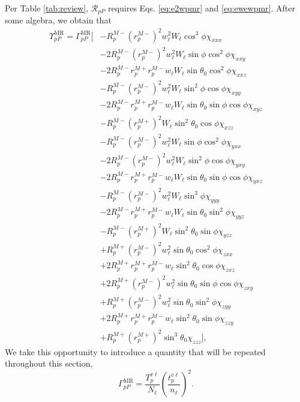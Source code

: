 Per Table \ref{tab:review}, $\mathcal{R}_{pP}$ requires Eqs. \eqref{eq:e2wpmr}
and \eqref{eq:ewewpmr}. After some algebra, we obtain that
\begin{equation}\label{eq:rppfullmr}
\begin{split}
\Upsilon^{\mathrm{MR}}_{pP} =
\Gamma^{\mathrm{MR}}_{pP}
\bigg[
&-R^{M-}_{p}\left(r^{M-}_{p}\right)^{2}w^{2}_{\ell}W_{\ell}\cos^{3}\phi
\chi_{xxx}\\
&-2R^{M-}_{p}\left(r^{M-}_{p}\right)^{2}w^{2}_{\ell}W_{\ell}\sin\phi\cos^{2}\phi
\chi_{xxy}\\
&-2R^{M-}_{p}r^{M+}_{p}r^{M-}_{p}w_{\ell}W_{\ell}\sin\theta_{0}\cos^{2}\phi
\chi_{xxz}\\
&-R^{M-}_{p}\left(r^{M-}_{p}\right)^{2}w^{2}_{\ell}W_{\ell}\sin^{2}\phi\cos\phi
\chi_{xyy}\\
&-2R^{M-}_{p}r^{M+}_{p}r^{M-}_{p}w_{\ell}W_{\ell}\sin\theta_{0}\sin\phi\cos\phi
\chi_{xyz}\\
&-R^{M-}_{p}\left(r^{M+}_{p}\right)^{2}W_{\ell}\sin^{2}\theta_{0}\cos\phi
\chi_{xzz}\\
&-R^{M-}_{p}\left(r^{M-}_{p}\right)^{2}w^{2}_{\ell}W_{\ell}\sin\phi\cos^{2}\phi
\chi_{yxx}\\
&-2R^{M-}_{p}\left(r^{M-}_{p}\right)^{2}w^{2}_{\ell}W_{\ell}\sin^{2}\phi\cos\phi
\chi_{yxy}\\
&-2R^{M-}_{p}r^{M+}_{p}r^{M-}_{p}w_{\ell}W_{\ell}\sin\theta_{0}\sin\phi\cos\phi
\chi_{yxz}\\
&-R^{M-}_{p}\left(r^{M-}_{p}\right)^{2}w^{2}_{\ell}W_{\ell}\sin^{3}\phi
\chi_{yyy}\\
&-2R^{M-}_{p}r^{M+}_{p}r^{M-}_{p}w_{\ell}W_{\ell}\sin\theta_{0}\sin^{2}\phi
\chi_{yyz}\\
&-R^{M-}_{p}\left(r^{M+}_{p}\right)^{2}W_{\ell}\sin^{2}\theta_{0}\sin\phi
\chi_{yzz}\\
&+R^{M+}_{p}\left(r^{M-}_{p}\right)^{2}w^{2}_{\ell}\sin\theta_{0}\cos^{2}\phi
\chi_{zxx}\\
&+2R^{M+}_{p}r^{M+}_{p}r^{M-}_{p}w_{\ell}\sin^{2}\theta_{0}\cos\phi
\chi_{zxz}\\
&+2R^{M+}_{p}\left(r^{M-}_{p}\right)^{2}w^{2}_{\ell}\sin\theta_{0}\sin\phi
\cos\phi\chi_{zxy}\\
&+R^{M+}_{p}\left(r^{M-}_{p}\right)^{2}w^{2}_{\ell}\sin\theta_{0}\sin^{2}\phi
\chi_{zyy}\\
&+2R^{M+}_{p}r^{M+}_{p}r^{M-}_{p}w_{\ell}\sin^{2}\theta_{0}\sin\phi
\chi_{zzy}\\
&+R^{M+}_{p}\left(r^{M+}_{p}\right)^{2}\sin^{3}\theta_{0}
\chi_{zzz}
\bigg],
\end{split}
\end{equation}
We take this opportunity to introduce a quantity that will be repeated
throughout this section,
\begin{equation}\label{eq:gammappmr}
\Gamma^{\mathrm{MR}}_{pP} =
\frac{T^{v\ell}_{p}}{N_{\ell}}
\left(\frac{t^{v\ell}_{p}}{n_{\ell}}\right)^{2}.
\end{equation}

